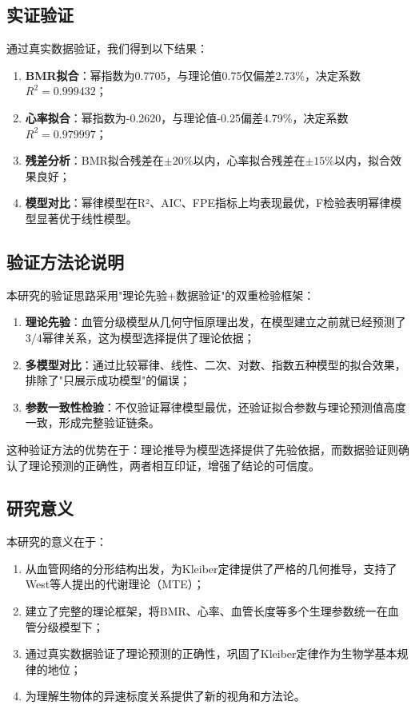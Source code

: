 \subsection{实证验证}

通过真实数据验证，我们得到以下结果：

\begin{enumerate}
    \item \textbf{BMR拟合}：幂指数为0.7705，与理论值0.75仅偏差2.73\%，决定系数$R^2 = 0.999432$；
    \item \textbf{心率拟合}：幂指数为-0.2620，与理论值-0.25偏差4.79\%，决定系数$R^2 = 0.979997$；
    \item \textbf{残差分析}：BMR拟合残差在$\pm 20\%$以内，心率拟合残差在$\pm 15\%$以内，拟合效果良好；
    \item \textbf{模型对比}：幂律模型在R²、AIC、FPE指标上均表现最优，F检验表明幂律模型显著优于线性模型。
\end{enumerate}

\subsection{验证方法论说明}

本研究的验证思路采用"理论先验+数据验证"的双重检验框架：

\begin{enumerate}
    \item \textbf{理论先验}：血管分级模型从几何守恒原理出发，在模型建立之前就已经预测了3/4幂律关系，这为模型选择提供了理论依据；
    \item \textbf{多模型对比}：通过比较幂律、线性、二次、对数、指数五种模型的拟合效果，排除了"只展示成功模型"的偏误；
    \item \textbf{参数一致性检验}：不仅验证幂律模型最优，还验证拟合参数与理论预测值高度一致，形成完整验证链条。
\end{enumerate}

这种验证方法的优势在于：理论推导为模型选择提供了先验依据，而数据验证则确认了理论预测的正确性，两者相互印证，增强了结论的可信度。

\subsection{研究意义}

本研究的意义在于：

\begin{enumerate}
    \item 从血管网络的分形结构出发，为Kleiber定律提供了严格的几何推导，支持了West等人提出的代谢理论（MTE）；
    \item 建立了完整的理论框架，将BMR、心率、血管长度等多个生理参数统一在血管分级模型下；
    \item 通过真实数据验证了理论预测的正确性，巩固了Kleiber定律作为生物学基本规律的地位；
    \item 为理解生物体的异速标度关系提供了新的视角和方法论。
\end{enumerate}

